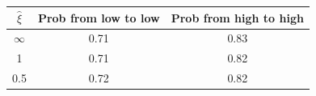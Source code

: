 \begin{tabular}{ccc}
\hline
\rule{0pt}{1.2em}
$\widehat \xi$  &Prob from low to low& Prob from high to high \\
\hline
$\infty$ &  0.71 & 0.83 \\
1 &  0.71 & 0.82 \\
0.5 &  0.72 & 0.82 \\


\hline
\end{tabular}
